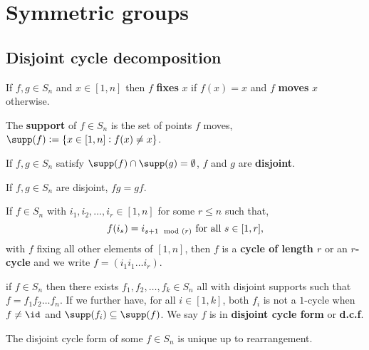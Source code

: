 \documentclass[../Year1/Year1.tex]{subfiles}
\begin{document}
\section{Symmetric groups}

\subsection{Disjoint cycle decomposition}

\begin{definition}
    If $f,g\in S_n$ and $x\in[1,n]$ then $f$ \textbf{fixes} $x$ if $f(x)=x$ and $f$ \textbf{moves} $x$ otherwise. 
\end{definition}

\begin{definition}
    The \textbf{support} of $f\in S_n$ is the set of points $f$ moves, $\supp(f):=\{x\in[1,n]:f(x)\neq x\}$.
\end{definition}

\begin{definition}
    If $f,g\in S_n$ satisfy $\supp(f)\cap\supp(g)=\emptyset$, $f$ and $g$ are \textbf{disjoint}.
\end{definition}

\begin{lemma}
    If $f,g\in S_n$ are disjoint, $fg=gf$.
\end{lemma}

\begin{definition}[Cycles]
    If $f\in S_n$ with $i_1,i_2,\ldots,i_r\in[1,n]$ for some $r\leq n$ such that, \[
        f(i_s) = i_{s+1 \mod(r)} \ \text{\textcolor{black}{for all }} s\in[1,r]
    \textcolor{black}{,}
    \] with $f$ fixing all other elements of $[1,n]$, then $f$ is a \textbf{cycle of length $r$} or an \textbf{$r$-cycle} and we write $f=(i_1i_1\ldots i_r)$.
\end{definition}

\begin{theorem}
    if $f\in S_n$ then there exists $f_1,f_2,\ldots,f_k\in S_n$ all with disjoint supports such that $f=f_1f_2\ldots f_n$. If we further have, for all $i\in[1,k]$, both $f_i$ is not a $1$-cycle when $f\neq \id$ and $\supp(f_i)\subseteq\supp(f)$. We say $f$ is in \textbf{disjoint cycle form} or \textbf{d.c.f}.
\end{theorem}

\begin{theorem}
    The disjoint cycle form of some $f\in S_n$ is unique up to rearrangement.
\end{theorem}
\end{document}

